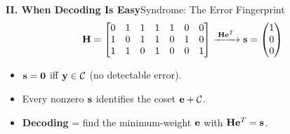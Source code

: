 \begin{frame}{\textbf{II. When Decoding Is Easy}}{Syndrome: The Error Fingerprint}
\small
{}
\[
  \mathbf{H} = \begin{bmatrix}
    0&1&1&1&1&0&0\\
    1&0&1&1&0&1&0\\
    1&1&0&1&0&0&1
  \end{bmatrix}
  \xrightarrow{\;\mathbf{H}\mathbf{e}^T\;}
  \mathbf{s} = \begin{pmatrix}1\\0\\0\end{pmatrix}
\]
\begin{itemize}
  \item $\mathbf{s} = \mathbf{0}$ iff $\mathbf{y}\in\mathcal{C}$ (no detectable error).
  \item Every nonzero $\mathbf{s}$ identifies the coset $\mathbf{e} + \mathcal{C}$.
  \item \textbf{Decoding} = find the minimum-weight $\mathbf{e}$ with $\mathbf{H}\mathbf{e}^T = \mathbf{s}$.
\end{itemize}
\end{frame}

